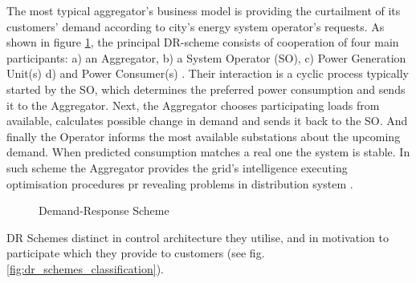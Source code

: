 The most typical aggregator's business model is providing the curtailment of its customers' demand according to city's energy system operator's requests. As shown in figure \ref{fig:DR_scheme}, the principal DR-scheme consists of cooperation of four main participants: a) an Aggregator, b) a System Operator (SO), c) Power Generation Unit(s) d) and Power Consumer(s) \cite{Medina2010}. Their interaction is a cyclic process typically started by the SO, which determines the preferred power consumption and sends it to the Aggregator. Next, the Aggregator chooses participating loads from available, calculates possible change in demand and sends it back to the SO. And finally the Operator informs the most available substations about the upcoming demand. When predicted consumption matches a real one the system is stable. In such scheme the Aggregator provides the grid's intelligence executing optimisation procedures pr revealing problems in distribution system \cite{Vardakas2015}. 

\begin{figure}
\centering
{}
    \caption{Demand-Response Scheme}
    \label{fig:DR_scheme}
\end{figure}


DR Schemes distinct in control architecture they utilise, and in motivation to participate which they provide to customers (see fig. \ref{fig:dr_schemes_classification}).

